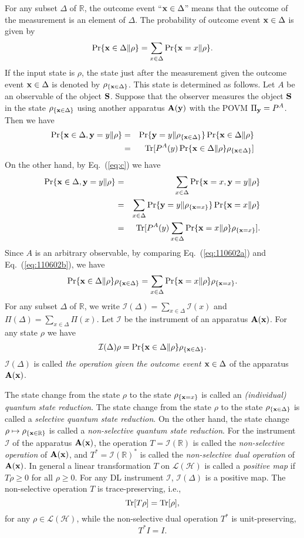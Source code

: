 \documentclass[graybox]{svmult}
\newcommand{\beq}{\begin{equation}}
\newcommand{\eeq}{\end{equation}}
\newcommand{\beqa}{\begin{eqnarray}}
\newcommand{\eeqa}{\end{eqnarray}}
\newcommand{\bA}{{\bf A}}
\newcommand{\bS}{{\bf S}}
\newcommand{\cH}{{\mathcal H}}
\newcommand{\cI}{{\mathcal I}}
\newcommand{\cL}{{\mathcal L}}
\newcommand{\nn}{\nonumber}
\newcommand{\rh}{\rho}
\newcommand{\De}{\Delta}
\newcommand{\Eq}[1]{Eq.~(\ref{eq:#1})}
\newcommand{\Tr}{\mbox{\rm Tr}}
\newcommand{\bx}{{\bf x}}
\newcommand{\by}{{\bf y}}
\newcommand{\R}{\mathbb{R}}
\begin{document}
For any subset $\De$ of $\R$, the outcome event ``$\bx\in\De$'' 
means that the outcome of the measurement is an element of 
$\De$.  The probability of outcome event $\bx\in\De$ is given by
\beq
\Pr\{\bx\in\De\|\rh\}=\sum_{x\in\De}\Pr\{\bx=x\|\rh\}.
\eeq
If the input state is  $\rh$, the state just after the measurement given
 the outcome event $\bx\in\De$ 
is denoted by $\rh_{\{\bx\in\De\}}$.
This state is determined as follows.
Let $A$ be an observable of the object $\bS$.
Suppose that the observer measures the object $\bS$ in the state $\rh_{\{\bx\in\De\}}$ 
using  another apparatus   $\bA(\by)$  with the POVM $\Pi_{\by}=P^{A}$. 
Then we have
\beqa
\Pr\{\bx\in\De,\by=y\|\rh\}&=&\Pr\{\by=y\|\rh_{\{\bx\in\De\}}\}\Pr\{\bx\in\De\|\rh\}\nn\\
&=&\Tr[P^{A}(y)\Pr\{\bx\in\De\|\rh\}\rh_{\{\bx\in\De\}}]\label{eq:110602a}
\eeqa
On the other hand,  by \Eq{c} we have
\beqa
\Pr\{\bx\in\De,\by=y\|\rh\}
&=&\sum_{x\in\De}\Pr\{\bx=x,\by=y\|\rh\}\nn\\
&=&\sum_{x\in\De}\Pr\{\by=y\|\rh_{\{\bx=x\}}\}\Pr\{\bx=x\|\rh\}\nn\\
&=&\Tr[P^{A}(y)\sum_{x\in\De}\Pr\{\bx=x\|\rh\}\rh_{\{\bx=x\}}].
\label{eq:110602b}
\eeqa
Since $A$ is an arbitrary observable, 
 by comparing \Eq{110602a} and \Eq{110602b},
we have 
\beq
\Pr\{\bx\in\De\|\rh\}\rh_{\{\bx\in\De\}}=
\sum_{x\in\De}\Pr\{\bx=x\|\rh\}\rh_{\{\bx=x\}}.
\eeq
For any subset $\De$ of $\R$, we write
 $\cI(\De)=\sum_{x\in\De}\cI(x)$ and $\Pi(\De)=\sum_{x\in\De}\Pi(x)$.
Let  $\cI$  be the instrument of an apparatus  $\bA(\bx)$.
For any state  $\rh$ we have
\beq
\cI(\De)\rh=\Pr\{\bx\in\De\|\rh\}\rh_{\{\bx\in\De\}}.
\eeq
$\cI(\De)$ is called {\em the operation given the outcome event
$\bx\in\De$} of the apparatus $\bA(\bx)$.

The state change from the state  $\rh$ to the state $\rh_{\{\bx=x\}}$ 
is called an {\em (individual) quantum state reduction}.
The state change from the state  $\rh$ to the state $\rh_{\{\bx\in\De\}}$ 
is called a {\em selective quantum state reduction}.
On the other hand, the state change $\rh\mapsto\rh_{\{\bx\in\R\}}$ is called 
a {\em  non-selective quantum state reduction}.
For the instrument $\cI$  of the apparatus $\bA(\bx)$,
the operation  $T=\cI(\R)$ is called the {\em non-selective operation}  of $\bA(\bx)$,
and $T^{*}=\cI(\R)^{*}$ is called  the  {\em  non-selective dual operation} of 
$\bA(\bx)$.
In general a linear transformation $T$ on $\cL(\cH)$ is called a {\em positive map}
if $T\rh\ge 0$ for all $\rh\ge 0$.
For any DL instrument $\cI$, $\cI(\De)$ is a positive map.
The non-selective operation $T$  is trace-preserving, i.e., 
\beq
\Tr[T\rh]=\Tr[\rh],
\eeq
for any $\rh\in\cL(\cH)$,
while the non-selective dual
operation $T^{*}$ is unit-preserving, 
\beq
T^{*}I=I.
\eeq
\end{document}

